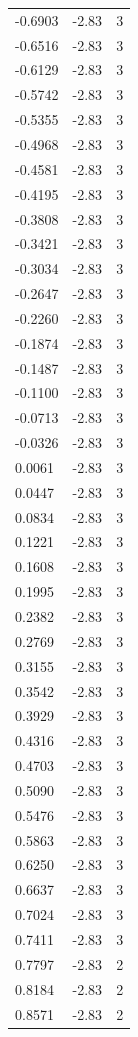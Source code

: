 \begin{longtable}{lrr}
  -0.6903 & -2.83 & 3 \\
  -0.6516 & -2.83 & 3 \\
  -0.6129 & -2.83 & 3 \\
  -0.5742 & -2.83 & 3 \\
  -0.5355 & -2.83 & 3 \\
  -0.4968 & -2.83 & 3 \\
  -0.4581 & -2.83 & 3 \\
  -0.4195 & -2.83 & 3 \\
  -0.3808 & -2.83 & 3 \\
  -0.3421 & -2.83 & 3 \\
  -0.3034 & -2.83 & 3 \\
  -0.2647 & -2.83 & 3 \\
  -0.2260 & -2.83 & 3 \\
  -0.1874 & -2.83 & 3 \\
  -0.1487 & -2.83 & 3 \\
  -0.1100 & -2.83 & 3 \\
  -0.0713 & -2.83 & 3 \\
  -0.0326 & -2.83 & 3 \\
  0.0061 & -2.83 & 3 \\
  0.0447 & -2.83 & 3 \\
  0.0834 & -2.83 & 3 \\
  0.1221 & -2.83 & 3 \\
  0.1608 & -2.83 & 3 \\
  0.1995 & -2.83 & 3 \\
  0.2382 & -2.83 & 3 \\
  0.2769 & -2.83 & 3 \\
  0.3155 & -2.83 & 3 \\
  0.3542 & -2.83 & 3 \\
  0.3929 & -2.83 & 3 \\
  0.4316 & -2.83 & 3 \\
  0.4703 & -2.83 & 3 \\
  0.5090 & -2.83 & 3 \\
  0.5476 & -2.83 & 3 \\
  0.5863 & -2.83 & 3 \\
  0.6250 & -2.83 & 3 \\
  0.6637 & -2.83 & 3 \\
  0.7024 & -2.83 & 3 \\
  0.7411 & -2.83 & 3 \\
  0.7797 & -2.83 & 2 \\
  0.8184 & -2.83 & 2 \\
  0.8571 & -2.83 & 2 \\

\end{longtable}
